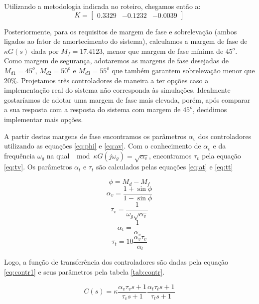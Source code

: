 \documentclass{article}
\begin{document}
Utilizando a metodologia indicada no roteiro\cite{bb:roteiro}, chegamos então a: 
\begin{equation}
\label{eq:matk}
K=
\begin{bmatrix}
0.3329 & -0.1232 & -0.0039
\end{bmatrix}
\end{equation}

Posteriormente, para os requisitos de margem de fase e sobrelevação (ambos ligados ao fator de amortecimento do sistema), calculamos a margem de fase de $\kappa G(s)$ dada por $M_f=17.4123$, menor que margem de fase mínima de $45^o$. Como margem de segurança, adotaremos as margens de fase desejadas de $M_{d1}=45^o$, $M_{d2}=50^o$ e $M_{d3}=55^o$ que também garantem sobrelevação menor que $20\%$. Projetamos três controladores de maneira a ter opções caso a implementação real do sistema não corresponda às simulações. Idealmente gostaríamos de adotar uma margem de fase mais elevada, porém, após comparar a sua resposta com a resposta do sistema com margem de $45^o$, decidimos implementar mais opções.

A partir destas margens de fase encontramos os parâmetros $\alpha_v$ dos controladores utilizando as equações \ref{eq:phi} e \ref{eq:av}. Com o conhecimento de $\alpha_v$ e da frequência $\omega_g$ na qual $\mod{\kappa G(j\omega_g)}=\sqrt{\alpha_v}$, encontramos $\tau_v$ pela equação \ref{eq:tv}. Os parâmetros $\alpha_t$ e $\tau_t$ são calculados pelas equações \ref{eq:at} e \ref{eq:tt}

\begin{equation}
\label{eq:phi}
\phi=M_d-M_f
\end{equation}
\begin{equation}
	\label{eq:av}
	\alpha_v=\frac{1+\sin{\phi}}{1-\sin{\phi}}
\end{equation}
\begin{equation}
	\label{eq:tv}
	\tau_v=\frac{1}{\omega_g \sqrt{\alpha_v}}
\end{equation}
\begin{equation}
\label{eq:at}
\alpha_t=\frac{1}{\alpha_v}
\end{equation}
\begin{equation}
\label{eq:tt}
\tau_t=10\frac{\alpha_v \tau_v}{\alpha_t}
\end{equation}

Logo, a função de transferência dos controladores são dadas pela equação \ref{eq:contr1} e seus parâmetros pela tabela \ref{tab:contr}.

\begin{equation}
\label{eq:contr}
C(s)=\kappa \frac{\alpha_v \tau_v s + 1}{\tau_v s + 1} \frac{\alpha_t \tau_t s + 1}{\tau_t s + 1}
\end{equation}
\end{document}
